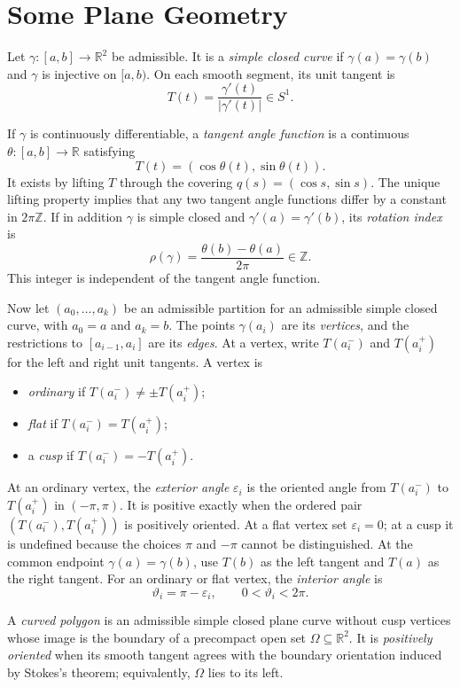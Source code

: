 \section{Some Plane Geometry}

Let $\gamma\colon[a,b]\to\mathbb R^2$ be admissible. It is a \emph{simple
closed curve} if $\gamma(a)=\gamma(b)$ and $\gamma$ is injective on $[a,b)$.
On each smooth segment, its unit tangent is
\[
T(t)=\frac{\gamma'(t)}{|\gamma'(t)|}\in S^1.
\]

If $\gamma$ is continuously differentiable, a \emph{tangent angle function}
is a continuous $\theta\colon[a,b]\to\mathbb R$ satisfying
\[
T(t)=(\cos\theta(t),\sin\theta(t)).
\]
It exists by lifting $T$ through the covering
$q(s)=(\cos s,\sin s)$.
The unique lifting property implies that any two tangent angle functions differ
by a constant in $2\pi\mathbb Z$.
If in addition $\gamma$ is simple closed and
$\gamma'(a)=\gamma'(b)$, its \emph{rotation index} is
\[
\rho(\gamma)=\frac{\theta(b)-\theta(a)}{2\pi}\in\mathbb Z.
\]
This integer is independent of the tangent angle function.

Now let $(a_0,\ldots,a_k)$ be an admissible partition for an admissible simple
closed curve, with $a_0=a$ and $a_k=b$. The points $\gamma(a_i)$ are its
\emph{vertices}, and the restrictions to $[a_{i-1},a_i]$ are its \emph{edges}.
At a vertex, write $T(a_i^-)$ and $T(a_i^+)$ for the left and right unit
tangents. A vertex is
\begin{itemize}
\item \emph{ordinary} if $T(a_i^-)\ne\pm T(a_i^+)$;
\item \emph{flat} if $T(a_i^-)=T(a_i^+)$;
\item a \emph{cusp} if $T(a_i^-)=-T(a_i^+)$.
\end{itemize}

At an ordinary vertex, the \emph{exterior angle} $\varepsilon_i$ is the
oriented angle from $T(a_i^-)$ to $T(a_i^+)$ in $(-\pi,\pi)$. It is positive
exactly when the ordered pair $(T(a_i^-),T(a_i^+))$ is positively oriented.
At a flat vertex set $\varepsilon_i=0$; at a cusp it is undefined because the
choices $\pi$ and $-\pi$ cannot be distinguished. At the common endpoint
$\gamma(a)=\gamma(b)$, use $T(b)$ as the left tangent and $T(a)$ as the right
tangent. For an ordinary or flat vertex, the \emph{interior angle} is
\[
\vartheta_i=\pi-\varepsilon_i,
\qquad 0<\vartheta_i<2\pi.
\]

A \emph{curved polygon} is an admissible simple closed plane curve without
cusp vertices whose image is the boundary of a precompact open set
$\Omega\subseteq\mathbb R^2$. It is \emph{positively oriented} when its smooth
tangent agrees with the boundary orientation induced by Stokes's theorem;
equivalently, $\Omega$ lies to its left.

